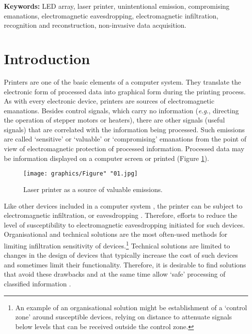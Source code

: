 \documentclass[10pt,a4paper]{article}
\begin{document}
\title{}

\author{Ireneusz Kubiak \and Joe Loughry}

\maketitle

\doublespacing

\begin{abstract}
	
\end{abstract}

\textbf{Keywords:} LED array, laser printer, unintentional emission,
compromising emanations, electromagnetic eavesdropping, electromagnetic
infiltration, recognition and reconstruction, non-invasive data acquisition.

\section{Introduction}

Printers are one of the basic elements of a computer system. They translate
the electronic form of processed data into graphical form during the printing
process. As with every electronic device, printers are sources of
electromagnetic emanations. Besides control signals, which carry no
information ({\it e.g.}, directing the operation of stepper motors or
heaters), there are other signals (useful signals) that are correlated with
the information being processed. Such emissions are called `sensitive' or
`valuable' or `compromising' emanations from the point of view of
electromagnetic protection of processed information. Processed data may
be information displayed on a computer screen or printed (Figure
\ref{figure:Figure_01}).

\begin{figure}[!t]
    \centering
    \texttt{[image: graphics/Figure" "01.jpg]}
    \caption{Laser printer as a source of valuable emissions.}
    \label{figure:Figure_01}
\end{figure}

Like other devices included in a computer system \cite{Kuhn2002,Kubiak2016a},
the printer can be subject to electromagnetic infiltration, or eavesdropping
\cite{Ketenci2015a,Kubiak2016b}. Therefore, efforts to reduce the level of
susceptibility to electromagnetic eavesdropping initiated for such devices.
Organisational and technical solutions \cite{Kubiak2006a} are the most
often-used methods for limiting infiltration
sensitivity of devices.\footnote{An example of an organisational solution
might be establishment of a `control zone' around susceptible devices,
relying on distance to attenuate signals below levels that can be received
outside the control zone.} Technical solutions are limited to changes in the
design of devices that typically increase the cost of such devices and
sometimes limit their functionality. Therefore, it is desirable to find
solutions that avoid these drawbacks and at the same time allow `safe'
processing of classified information \cite{Wasfy2011a,Goel2012a}.
\end{document}
